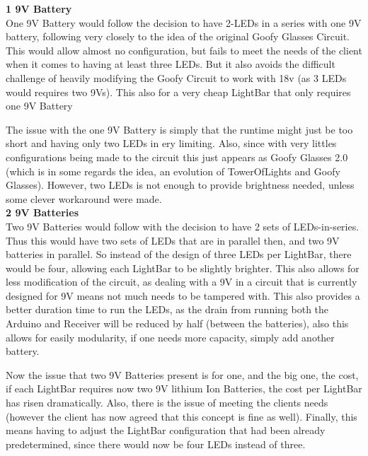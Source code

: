 \documentclass[12pt]{article}
\begin{document}
					\noindent\textbf{1 9V Battery}\\
					\indent One 9V Battery would follow the decision to have 2-LEDs in a series with one 9V battery, following very closely to the idea of the original Goofy Glasses Circuit. This would allow almost no configuration, but fails to meet the needs of the client when it comes to having at least three LEDs. But it also avoids the difficult challenge of heavily modifying the Goofy Circuit to work with 18v (as 3 LEDs would requires two 9Vs). This also for a very cheap LightBar that only requires one 9V Battery
					
					\indent The issue with the one 9V Battery is simply that the runtime might just be too short and having only two LEDs in ery limiting. Also, since with very littles configurations being made to the circuit this just appears as Goofy Glasses 2.0 (which is in some regards the idea, an evolution of TowerOfLights and Goofy Glasses). However, two LEDs is not enough to provide brightness needed, unless some clever workaround were made.\\
					
					
					\noindent\textbf{2 9V Batteries}\\
					\indent Two 9V Batteries would follow with the decision to have 2 sets of LEDs-in-series. Thus this would have two sets of LEDs that are in parallel then, and two 9V batteries in parallel. So instead of the design of three LEDs per LightBar, there would be four, allowing each LightBar to be slightly brighter. This also allows for less modification of the circuit, as dealing with a 9V in a circuit that is currently designed for 9V means not much needs to be tampered with. This also provides a better duration time to run the LEDs, as the drain from running both the Arduino and Receiver will be reduced by half (between the batteries), also this allows for easily modularity, if one needs more capacity, simply add another battery.
					
					\indent Now the issue that two 9V Batteries present is for one, and the big one, the cost, if each LightBar requires now two 9V lithium Ion Batteries, the cost per LightBar has risen dramatically. Also, there is the issue of meeting the clients needs (however the client has now agreed that this concept is fine as well). Finally, this means having to adjust the LightBar configuration that had been already predetermined, since there would now be four LEDs instead of three.\\
					
\end{document}
